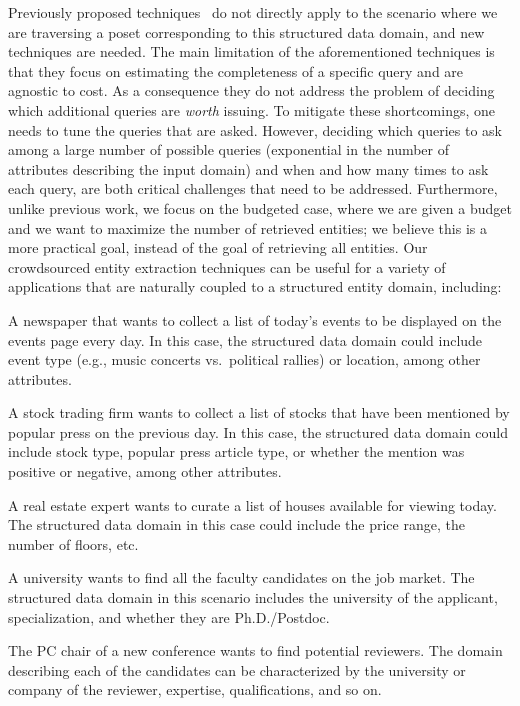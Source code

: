 Previously proposed techniques~\cite{trushkowsky:2013} do not directly apply to the scenario where we are traversing a poset corresponding to this structured data domain, and new techniques are needed. The main limitation of the aforementioned techniques is that they focus on estimating the completeness of a specific query and are agnostic to cost. As a consequence they do not address the problem of deciding which additional queries are \emph{worth} issuing.  To mitigate these shortcomings, one needs to tune the queries that are asked. However, deciding which queries to ask among a large number of possible queries (exponential in the number of attributes describing the input domain) and when and how many times to ask each query, are both critical challenges that need to be addressed. Furthermore, unlike previous work, we focus on the budgeted case, where we are given a budget and we want to maximize the number of retrieved entities; we believe this is a more practical goal, instead of the goal of retrieving all entities.  
\iftr
Our crowdsourced entity extraction techniques can be useful for a variety of applications that are naturally coupled to a structured entity domain, including:
\squishlist
\item A newspaper that wants to collect a list of today's events to be displayed on the events page every day. 
In this case, the structured data domain could include event type (e.g., music concerts vs.~political rallies) or location, among other attributes.
\item A stock trading firm wants to collect a list of stocks that have been mentioned by popular press on the previous day. In this case, the structured data domain could include stock type, popular press article type, or whether the mention was positive or negative, among other attributes. 
\item A real estate expert wants to curate a list of houses available for viewing today. The structured data domain in this case could include the price range, the number of floors, etc.
\item A university wants to find all the faculty candidates on the job market. The structured data domain in this scenario includes the university of the applicant, specialization, and whether they are Ph.D./Postdoc.
\item The PC chair of a new conference wants to find potential reviewers. The domain describing each of the candidates can be characterized by the university or company of the reviewer, expertise, qualifications, and so on. 
\squishend
\fi

